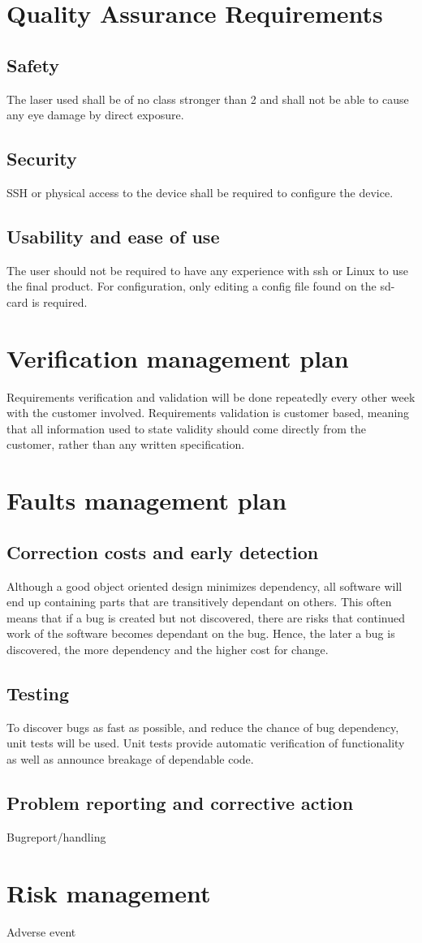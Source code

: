 \documentclass{article}
\begin{document}
\section{Quality Assurance Requirements}
\subsection{Safety}
The laser used shall be of no class stronger than 2 and shall not be able to cause any eye damage by direct exposure.
\subsection{Security}
SSH or physical access to the device shall be required to configure the device.
\subsection{Usability and ease of use}
The user should not be required to have any experience with ssh or Linux to use the final product.
For configuration, only editing a config file found on the sd-card is required.

\section{Verification management plan}
Requirements verification and validation will be done repeatedly every other week with the customer involved.
Requirements validation is customer based, meaning that all information used to state validity should come directly from the customer, rather than any written specification.

\section{Faults management plan}
\subsection{Correction costs and early detection}	
Although a good object oriented design minimizes dependency, all software will end up containing parts that are transitively dependant on others.
This often means that if a bug is created but not discovered, there are risks that continued work of the software becomes dependant on the bug.
Hence, the later a bug is discovered, the more dependency and the higher cost for change.

\subsection{Testing}
To discover bugs as fast as possible, and reduce the chance of bug dependency, unit tests will be used.
Unit tests provide automatic verification of functionality as well as announce breakage of dependable code.

\subsection{Problem reporting and corrective action}
Bugreport/handling


\section{Risk management}
Adverse event
\section{}
\end{document}
